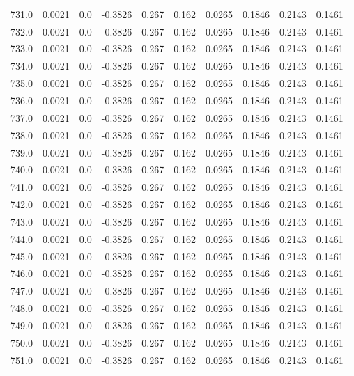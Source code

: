 \begin{longtable}{lrrrrrrrrr}
731.0 & 0.0021 & 0.0 & -0.3826 & 0.267 & 0.162 & 0.0265 & 0.1846 & 0.2143 & 0.1461 \\
732.0 & 0.0021 & 0.0 & -0.3826 & 0.267 & 0.162 & 0.0265 & 0.1846 & 0.2143 & 0.1461 \\
733.0 & 0.0021 & 0.0 & -0.3826 & 0.267 & 0.162 & 0.0265 & 0.1846 & 0.2143 & 0.1461 \\
734.0 & 0.0021 & 0.0 & -0.3826 & 0.267 & 0.162 & 0.0265 & 0.1846 & 0.2143 & 0.1461 \\
735.0 & 0.0021 & 0.0 & -0.3826 & 0.267 & 0.162 & 0.0265 & 0.1846 & 0.2143 & 0.1461 \\
736.0 & 0.0021 & 0.0 & -0.3826 & 0.267 & 0.162 & 0.0265 & 0.1846 & 0.2143 & 0.1461 \\
737.0 & 0.0021 & 0.0 & -0.3826 & 0.267 & 0.162 & 0.0265 & 0.1846 & 0.2143 & 0.1461 \\
738.0 & 0.0021 & 0.0 & -0.3826 & 0.267 & 0.162 & 0.0265 & 0.1846 & 0.2143 & 0.1461 \\
739.0 & 0.0021 & 0.0 & -0.3826 & 0.267 & 0.162 & 0.0265 & 0.1846 & 0.2143 & 0.1461 \\
740.0 & 0.0021 & 0.0 & -0.3826 & 0.267 & 0.162 & 0.0265 & 0.1846 & 0.2143 & 0.1461 \\
741.0 & 0.0021 & 0.0 & -0.3826 & 0.267 & 0.162 & 0.0265 & 0.1846 & 0.2143 & 0.1461 \\
742.0 & 0.0021 & 0.0 & -0.3826 & 0.267 & 0.162 & 0.0265 & 0.1846 & 0.2143 & 0.1461 \\
743.0 & 0.0021 & 0.0 & -0.3826 & 0.267 & 0.162 & 0.0265 & 0.1846 & 0.2143 & 0.1461 \\
744.0 & 0.0021 & 0.0 & -0.3826 & 0.267 & 0.162 & 0.0265 & 0.1846 & 0.2143 & 0.1461 \\
745.0 & 0.0021 & 0.0 & -0.3826 & 0.267 & 0.162 & 0.0265 & 0.1846 & 0.2143 & 0.1461 \\
746.0 & 0.0021 & 0.0 & -0.3826 & 0.267 & 0.162 & 0.0265 & 0.1846 & 0.2143 & 0.1461 \\
747.0 & 0.0021 & 0.0 & -0.3826 & 0.267 & 0.162 & 0.0265 & 0.1846 & 0.2143 & 0.1461 \\
748.0 & 0.0021 & 0.0 & -0.3826 & 0.267 & 0.162 & 0.0265 & 0.1846 & 0.2143 & 0.1461 \\
749.0 & 0.0021 & 0.0 & -0.3826 & 0.267 & 0.162 & 0.0265 & 0.1846 & 0.2143 & 0.1461 \\
750.0 & 0.0021 & 0.0 & -0.3826 & 0.267 & 0.162 & 0.0265 & 0.1846 & 0.2143 & 0.1461 \\
751.0 & 0.0021 & 0.0 & -0.3826 & 0.267 & 0.162 & 0.0265 & 0.1846 & 0.2143 & 0.1461 \\

\end{longtable}
